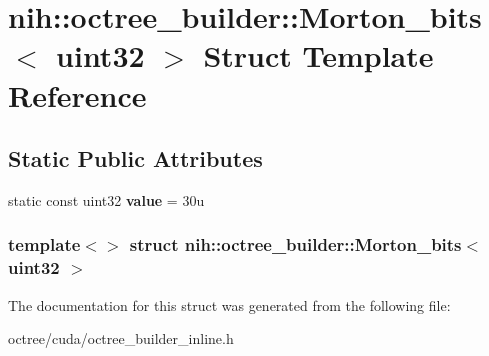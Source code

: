 \hypertarget{structnih_1_1octree__builder_1_1_morton__bits_3_01uint32_01_4}{
\section{nih\-:\-:octree\-\_\-builder\-:\-:\-Morton\-\_\-bits$<$ uint32 $>$ \-Struct \-Template \-Reference}
\label{structnih_1_1octree__builder_1_1_morton__bits_3_01uint32_01_4}
}
\subsection*{\-Static \-Public \-Attributes}
\begin{DoxyCompactItemize}
\item 
\hypertarget{structnih_1_1octree__builder_1_1_morton__bits_3_01uint32_01_4_a29fd65c0435546feb53edc0654d7bc4a}{
static const uint32 {\bfseries value} = 30u}
\label{structnih_1_1octree__builder_1_1_morton__bits_3_01uint32_01_4_a29fd65c0435546feb53edc0654d7bc4a}

\end{DoxyCompactItemize}
\subsubsection*{template$<$$>$ struct nih\-::octree\-\_\-builder\-::\-Morton\-\_\-bits$<$ uint32 $>$}



\-The documentation for this struct was generated from the following file\-:\begin{DoxyCompactItemize}
\item 
octree/cuda/octree\-\_\-builder\-\_\-inline.\-h\end{DoxyCompactItemize}
